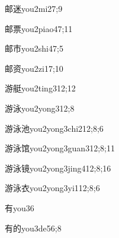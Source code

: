 \begin{verbete}{邮迷}{you2mi2}{7;9}
\end{verbete}

\begin{verbete}{邮票}{you2piao4}{7;11}
\end{verbete}

\begin{verbete}{邮市}{you2shi4}{7;5}
\end{verbete}

\begin{verbete}{邮资}{you2zi1}{7;10}
\end{verbete}

\begin{verbete}{游艇}{you2ting3}{12;12}
\end{verbete}

\begin{verbete}{游泳}{you2yong3}{12;8}
\end{verbete}

\begin{verbete}{游泳池}{you2yong3chi2}{12;8;6}
\end{verbete}

\begin{verbete}{游泳馆}{you2yong3guan3}{12;8;11}
\end{verbete}

\begin{verbete}{游泳镜}{you2yong3jing4}{12;8;16}
\end{verbete}

\begin{verbete}{游泳衣}{you2yong3yi1}{12;8;6}
\end{verbete}

\begin{verbete}{有}{you3}{6}
\end{verbete}

\begin{verbete}{有的}{you3de5}{6;8}
\end{verbete}

